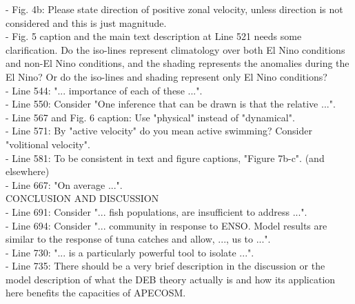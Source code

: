 \documentclass[12pt]{article}
\begin{document}
- Fig. 4b: Please state direction of positive zonal velocity, unless direction is not considered and this is just magnitude.\\

- Fig. 5 caption and the main text description at Line 521 needs some clarification. Do the iso-lines represent climatology over both El Nino conditions and non-El Nino conditions, and the shading represents the anomalies during the El Nino? Or do the iso-lines and shading represent only El Nino conditions?\\

- Line 544: "... importance of each of these ...".\\

- Line 550: Consider "One inference that can be drawn is that the relative ...".\\

- Line 567 and Fig. 6 caption: Use "physical" instead of "dynamical".\\

- Line 571: By "active velocity" do you mean active swimming? Consider "volitional velocity".\\

- Line 581: To be consistent in text and figure captions, "Figure 7b-c". (and elsewhere)\\

- Line 667: "On average ...".\\

CONCLUSION AND DISCUSSION\\

- Line 691: Consider "... fish populations, are insufficient to address ...".\\

- Line 694: Consider "... community in response to ENSO. Model results are similar to the response of tuna catches and allow, ..., us to ...".\\

- Line 730: "... is a particularly powerful tool to isolate ...".\\

- Line 735: There should be a very brief description in the discussion or the model description of what the DEB theory actually is and how its application here benefits the capacities of APECOSM.\\


\end{document}
